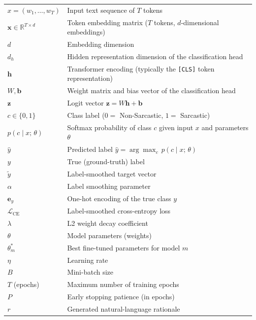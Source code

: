\begin{longtable}{p{2.8cm} p{9.2cm}}
$x = (w_1, \ldots, w_T)$  & Input text sequence of $T$ tokens \\
$\mathbf{x} \in \mathbb{R}^{T \times d}$ & Token embedding matrix ($T$ tokens, $d$-dimensional embeddings) \\
$d$                        & Embedding dimension \\
$d_h$                      & Hidden representation dimension of the classification head \\
$\mathbf{h}$               & Transformer encoding (typically the \texttt{[CLS]} token representation) \\
$W, \mathbf{b}$            & Weight matrix and bias vector of the classification head \\
$\mathbf{z}$               & Logit vector $\mathbf{z} = W\mathbf{h} + \mathbf{b}$ \\
$c \in \{0, 1\}$           & Class label ($0 =$ Non-Sarcastic, $1 =$ Sarcastic) \\
$p(c \mid x;\, \theta)$    & Softmax probability of class $c$ given input $x$ and parameters $\theta$ \\
$\hat{y}$                  & Predicted label $\hat{y} = \arg\max_c\, p(c \mid x;\, \theta)$ \\
$y$                        & True (ground-truth) label \\
$\tilde{y}$                & Label-smoothed target vector \\
$\alpha$                   & Label smoothing parameter \\
$\mathbf{e}_y$             & One-hot encoding of the true class $y$ \\
$\mathcal{L}_{\text{CE}}$  & Label-smoothed cross-entropy loss \\
$\lambda$                  & L2 weight decay coefficient \\
$\theta$                   & Model parameters (weights) \\
$\theta^{*}_m$             & Best fine-tuned parameters for model $m$ \\
$\eta$                     & Learning rate \\
$B$                        & Mini-batch size \\
$T$ (epochs)               & Maximum number of training epochs \\
$P$                        & Early stopping patience (in epochs) \\
$r$                        & Generated natural-language rationale \\

\end{longtable}
